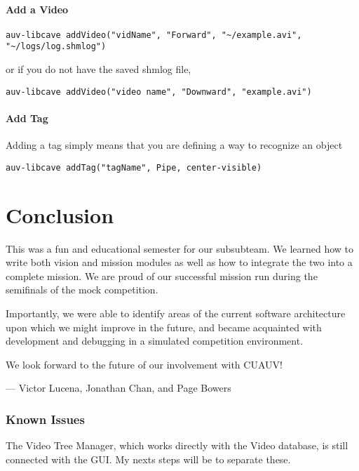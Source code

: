 \subsection{Add a Video}
\begin{lstlisting}[breaklines=true]
auv-libcave addVideo("vidName", "Forward", "~/example.avi", "~/logs/log.shmlog")
\end{lstlisting}
or if you do not have the saved shmlog file,
\begin{lstlisting}
auv-libcave addVideo("video name", "Downward", "example.avi")
\end{lstlisting}
\subsection{Add Tag}
Adding a tag simply means that you are defining a way to recognize an object
\begin{lstlisting}[breaklines=true]
auv-libcave addTag("tagName", Pipe, center-visible)
\end{lstlisting}



\part{Conclusion}

This was a fun and educational semester for our subsubteam. We learned how to write both vision and mission modules as well as how to integrate the two into a complete mission. We are proud of our successful mission run during the semifinals of the mock competition.

Importantly, we were able to identify areas of the current software architecture upon which we might improve in the future, and became acquainted with development and debugging in a simulated competition environment.

We look forward to the future of our involvement with CUAUV!

\begin{flushright}
--- Victor Lucena, Jonathan Chan, and Page Bowers
\end{flushright}





\pagebreak



\section{Known Issues}
The Video Tree Manager, which works directly with the Video database, is still connected with the GUI.  My nexts steps will be to separate these.

